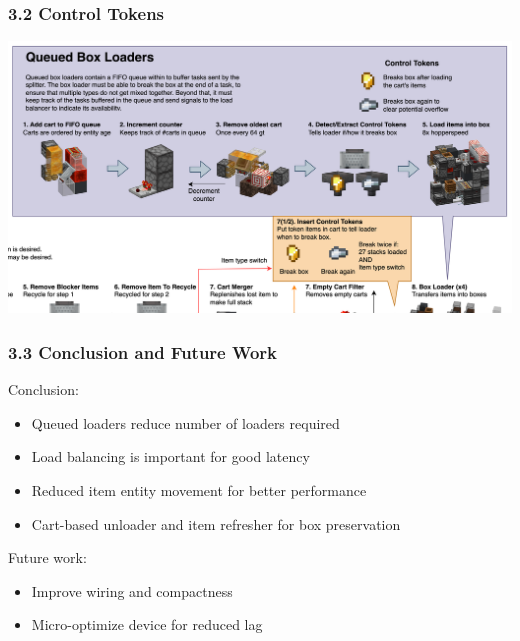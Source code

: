 \documentclass[aspectratio=169]{beamer}
\begin{document}
{
\logo{}
\begin{frame}
    \frametitle{3.2 Control Tokens}
    \centering
    \includegraphics[width=0.85\paperwidth]{IdealSplitting3zoom.png}
\end{frame}
}

\begin{frame}
    \frametitle{3.3 Conclusion and Future Work}

    Conclusion:
    \begin{itemize}
        \item Queued loaders reduce number of loaders required
        \item Load balancing is important for good latency
        \item Reduced item entity movement for better performance
        \item Cart-based unloader and item refresher for box preservation
    \end{itemize}

    Future work:
    \begin{itemize}
        \item Improve wiring and compactness
        \item Micro-optimize device for reduced lag
    \end{itemize}

\end{frame}
\end{document}
